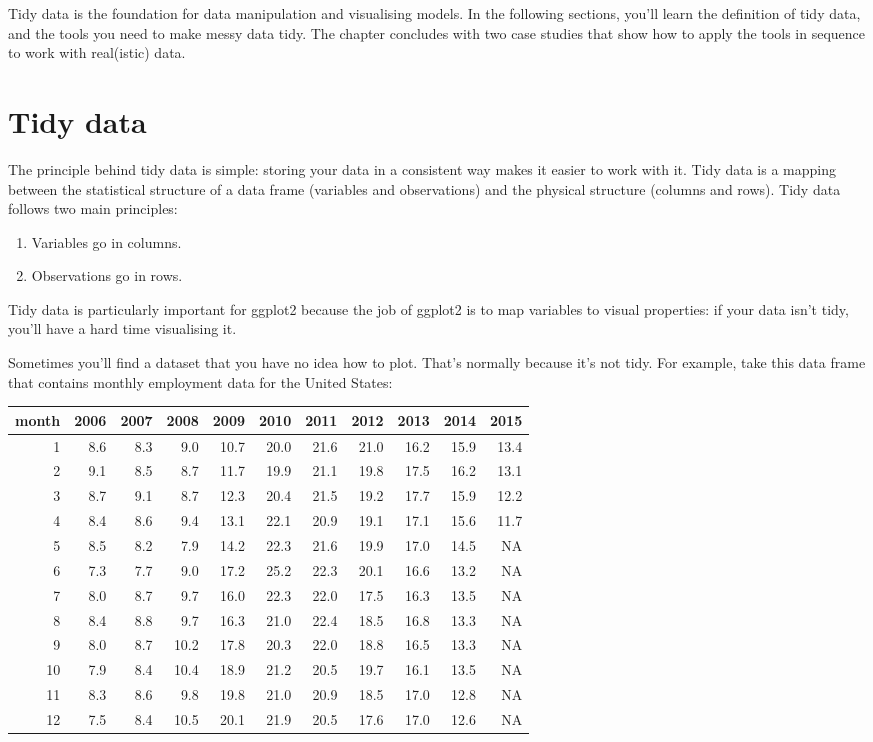 Tidy data is the foundation for data manipulation and visualising
models. In the following sections, you'll learn the definition of tidy
data, and the tools you need to make messy data tidy. The chapter
concludes with two case studies that show how to apply the tools in
sequence to work with real(istic) data.

\section{Tidy data}\label{sec:tidy-data}

The principle behind tidy data is simple: storing your data in a
consistent way makes it easier to work with it. Tidy data is a mapping
between the statistical structure of a data frame (variables and
observations) and the physical structure (columns and rows). Tidy data
follows two main principles: 

\begin{enumerate}
\def\labelenumi{\arabic{enumi}.}
\tightlist
\item
  Variables go in columns.
\item
  Observations go in rows.
\end{enumerate}

Tidy data is particularly important for ggplot2 because the job of
ggplot2 is to map variables to visual properties: if your data isn't
tidy, you'll have a hard time visualising it.

Sometimes you'll find a dataset that you have no idea how to plot.
That's normally because it's not tidy. For example, take this data frame
that contains monthly employment data for the United States:

\begin{longtable}[c]{@{}rrrrrrrrrrr@{}}
\toprule
month & 2006 & 2007 & 2008 & 2009 & 2010 & 2011 & 2012 & 2013 & 2014 &
2015\tabularnewline
\midrule
\endhead
1 & 8.6 & 8.3 & 9.0 & 10.7 & 20.0 & 21.6 & 21.0 & 16.2 & 15.9 &
13.4\tabularnewline
2 & 9.1 & 8.5 & 8.7 & 11.7 & 19.9 & 21.1 & 19.8 & 17.5 & 16.2 &
13.1\tabularnewline
3 & 8.7 & 9.1 & 8.7 & 12.3 & 20.4 & 21.5 & 19.2 & 17.7 & 15.9 &
12.2\tabularnewline
4 & 8.4 & 8.6 & 9.4 & 13.1 & 22.1 & 20.9 & 19.1 & 17.1 & 15.6 &
11.7\tabularnewline
5 & 8.5 & 8.2 & 7.9 & 14.2 & 22.3 & 21.6 & 19.9 & 17.0 & 14.5 &
NA\tabularnewline
6 & 7.3 & 7.7 & 9.0 & 17.2 & 25.2 & 22.3 & 20.1 & 16.6 & 13.2 &
NA\tabularnewline
7 & 8.0 & 8.7 & 9.7 & 16.0 & 22.3 & 22.0 & 17.5 & 16.3 & 13.5 &
NA\tabularnewline
8 & 8.4 & 8.8 & 9.7 & 16.3 & 21.0 & 22.4 & 18.5 & 16.8 & 13.3 &
NA\tabularnewline
9 & 8.0 & 8.7 & 10.2 & 17.8 & 20.3 & 22.0 & 18.8 & 16.5 & 13.3 &
NA\tabularnewline
10 & 7.9 & 8.4 & 10.4 & 18.9 & 21.2 & 20.5 & 19.7 & 16.1 & 13.5 &
NA\tabularnewline
11 & 8.3 & 8.6 & 9.8 & 19.8 & 21.0 & 20.9 & 18.5 & 17.0 & 12.8 &
NA\tabularnewline
12 & 7.5 & 8.4 & 10.5 & 20.1 & 21.9 & 20.5 & 17.6 & 17.0 & 12.6 &
NA\tabularnewline
\bottomrule
\end{longtable}

